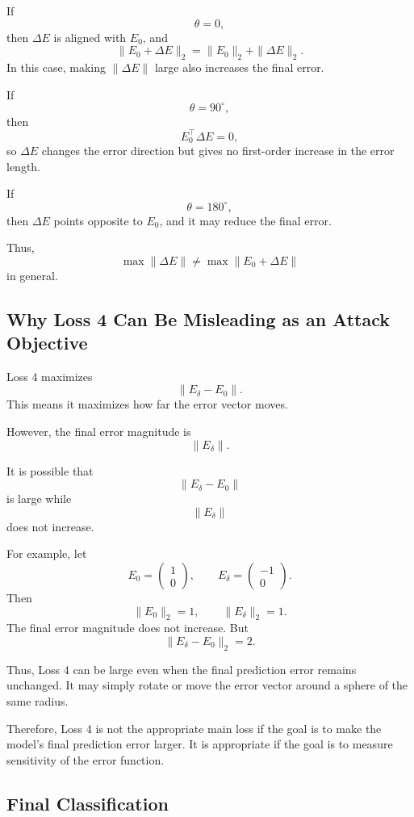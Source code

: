 \documentclass{article}
\begin{document}
If
\[
    \theta=0,
\]
then \(\Delta E\) is aligned with \(E_0\), and
\[
    \|E_0+\Delta E\|_2
    =
    \|E_0\|_2+\|\Delta E\|_2.
\]
In this case, making \(\|\Delta E\|\) large also increases the final error.

If
\[
    \theta=90^\circ,
\]
then
\[
    E_0^\top \Delta E=0,
\]
so \(\Delta E\) changes the error direction but gives no first-order increase in the error length.

If
\[
    \theta=180^\circ,
\]
then \(\Delta E\) points opposite to \(E_0\), and it may reduce the final error.

Thus,
\[
\boxed{
\max \|\Delta E\|
\neq
\max \|E_0+\Delta E\|
}
\]
in general.

\subsection{Why Loss 4 Can Be Misleading as an Attack Objective}

Loss 4 maximizes
\[
    \|E_\delta-E_0\|.
\]
This means it maximizes how far the error vector moves.

However, the final error magnitude is
\[
    \|E_\delta\|.
\]

It is possible that
\[
    \|E_\delta-E_0\|
\]
is large while
\[
    \|E_\delta\|
\]
does not increase.

For example, let
\[
    E_0=
    \begin{pmatrix}
    1\\
    0
    \end{pmatrix},
    \qquad
    E_\delta=
    \begin{pmatrix}
    -1\\
    0
    \end{pmatrix}.
\]
Then
\[
    \|E_0\|_2=1,
    \qquad
    \|E_\delta\|_2=1.
\]
The final error magnitude does not increase. But
\[
    \|E_\delta-E_0\|_2
    =
    2.
\]

Thus, Loss 4 can be large even when the final prediction error remains unchanged. It may simply rotate or move the error vector around a sphere of the same radius.

Therefore, Loss 4 is not the appropriate main loss if the goal is to make the model's final prediction error larger. It is appropriate if the goal is to measure sensitivity of the error function.

\subsection{Final Classification}
\end{document}
